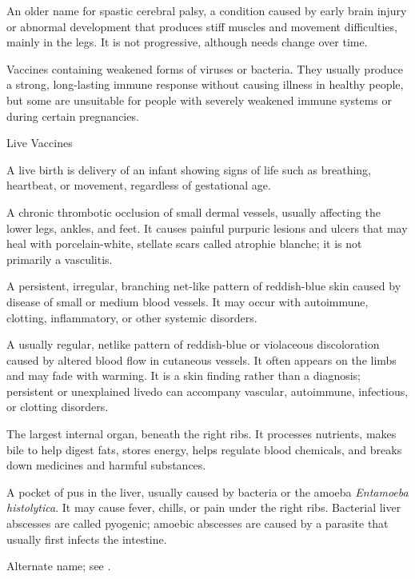  An older name for spastic cerebral palsy, a condition caused by early brain injury or abnormal development that produces stiff muscles and movement difficulties, mainly in the legs. It is not progressive, although needs change over time.

 Vaccines containing weakened forms of viruses or bacteria. They usually produce a strong, long-lasting immune response without causing illness in healthy people, but some are unsuitable for people with severely weakened immune systems or during certain pregnancies.

\synonyms
Live Vaccines

 A live birth is delivery of an infant showing signs of life such as breathing, heartbeat, or movement, regardless of gestational age.

 A chronic thrombotic occlusion of small dermal vessels, usually affecting the lower legs, ankles, and feet. It causes painful purpuric lesions and ulcers that may heal with porcelain-white, stellate scars called atrophie blanche; it is not primarily a vasculitis.

 A persistent, irregular, branching net-like pattern of reddish-blue skin caused by disease of small or medium blood vessels. It may occur with autoimmune, clotting, inflammatory, or other systemic disorders.

 A usually regular, netlike pattern of reddish-blue or
violaceous discoloration caused by altered blood flow in cutaneous vessels. It often
appears on the limbs and may fade with warming. It is a skin finding rather than a
diagnosis; persistent or unexplained livedo can accompany vascular, autoimmune, infectious,
or clotting disorders.

 The largest internal organ, beneath the right ribs. It processes nutrients, makes bile to help digest fats, stores energy, helps regulate blood chemicals, and breaks down medicines and harmful substances.

 A pocket of pus in the liver, usually caused by bacteria or
the amoeba \textit{Entamoeba histolytica}. It may cause fever, chills, or pain under
the right ribs. Bacterial liver abscesses are called pyogenic; amoebic abscesses are
caused by a parasite that usually first infects the intestine.

 Alternate name; see .

